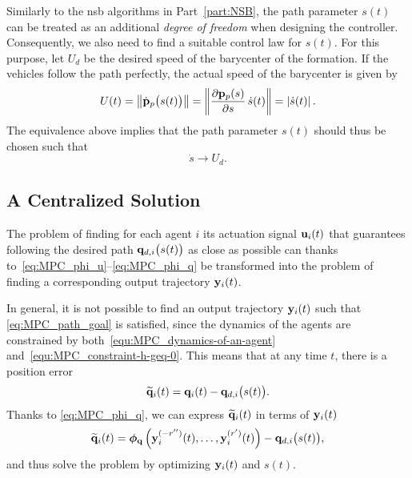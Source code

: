 Similarly to the \gls{nsb} algorithms in Part~\ref{part:NSB}, the path parameter $s(t)$ can be treated as an additional \emph{degree of freedom} when designing the controller. Consequently, we also need to find a suitable control law for $s(t)$. For this purpose, let $U_d$ be the desired speed of the barycenter of the formation. %
If the vehicles follow the path perfectly, the actual speed of the barycenter is given by
\begin{equation}
    U(t)
    =
    \left\|\dot{\mathbf{p}}_p \big( s(t) \big)\right\|
    =
    \left\|\frac{\partial \mathbf{p}_p(s)}{\partial s}\,\dot{s}(t) \right\| = \left|\dot{s}(t)\right|.
\end{equation}
The equivalence above implies that the path parameter $s(t)$ should thus be chosen such that
\begin{equation}
    \dot{s} \rightarrow U_d.
    \label{eq:MPC_param_goal}
\end{equation}



\subsection{A Centralized Solution}
\label{ssec:MPC_centralized}



The problem of finding for each agent $i$ its actuation signal $\mathbf{u}_i(t)$ that guarantees following the desired path $\mathbf{q}_{d,i} \big( s(t) \big)$ as close as possible can thanks to~\eqref{eq:MPC_phi_u}--\eqref{eq:MPC_phi_q} be transformed into the problem of finding a corresponding output trajectory $\mathbf{y}_i(t)$.

In general, it is not possible to find an output trajectory $\mathbf{y}_i(t)$ such that \eqref{eq:MPC_path_goal} is satisfied, since the dynamics of the agents are constrained by both~\eqref{equ:MPC_dynamics-of-an-agent} and~\eqref{equ:MPC_constraint-h-geq-0}. This means that at any time $t$, there is a position error
%
\begin{equation}
    \widetilde{\mathbf{q}}_i(t)
    =
    \mathbf{q}_i(t)
    -
    \mathbf{q}_{d,i} \big( s(t) \big) .
    \label{eq:MPC_q_tilde}
\end{equation}
%
Thanks to \eqref{eq:MPC_phi_q}, we can express $\widetilde{\mathbf{q}}_i(t)$ in terms of $\mathbf{y}_i(t)$
\begin{equation}
    \widetilde{\mathbf{q}}_i(t)
    =
    \bm{\phi}_{\mathbf{q}}\left(\mathbf{y}_i^{(-r'')}(t), \ldots, \mathbf{y}_i^{(r')}(t)\right)
    -
    \mathbf{q}_{d,i} \big( s(t) \big), \label{eq:MPC_y_tilde}
\end{equation}
and thus solve the problem by optimizing $\mathbf{y}_i(t)$ and $s(t)$.


